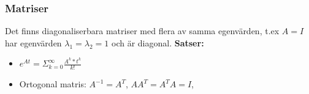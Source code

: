 \documentclass[twocolumn,a4paper]{article}
\begin{document}
\subsubsection*{Matriser}
Det finns diagonaliserbara matriser med flera av samma egenvärden, t.ex $A = I$ har egenvärden $\lambda_1 = \lambda_2 = 1$ och är diagonal.
\newline
\textbf{Satser:}
\begin{itemize}
    \item $e^{At} = \Sigma^{\infty}_{k=0} \frac{A^k*t^k}{k!}$
    \item Ortogonal matris: $A^{-1}=A^T$, $AA^T=A^TA=I$, %
    
\end{itemize}



\end{document}
